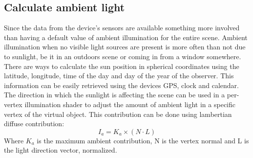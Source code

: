 \documentclass{article}
\begin{document}
\subsection{Calculate ambient light}
Since the data from the device's sensors are available something more involved than having a default value of ambient illumination for the entire scene. Ambient illumination when no visible light sources are present is more often than not due to sunlight, be it in an outdoors scene or coming in from a window somewhere. There are ways \cite{solar} to calculate the sun position in spherical coordinates using the latitude, longitude, time of the day and day of the year of the observer. This information can be easily retrieved using the devices GPS, clock and calendar. The direction in which the sunlight is affecting the scene can be used in a per-vertex illumination shader to adjust the amount of ambient light in a specific vertex of the virtual object. This contribution can be done using lambertian diffuse contribution:
\[
    I_a = K_a \times (N \cdot L)
\]
Where $K_a$ is the maximum ambient contribution, N is the vertex normal and L is the light direction vector, normalized.
\end{document}
